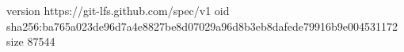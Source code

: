 version https://git-lfs.github.com/spec/v1
oid sha256:ba765a023de96d7a4e8827be8d07029a96d8b3eb8dafede79916b9e004531172
size 87544
